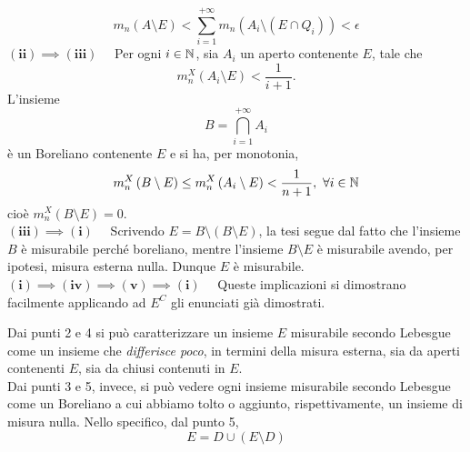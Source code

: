 \begin{demonstration}
\begin{equation*}
	m_n\left(A\setminus E\right)<\sum_{i=1}^{+\infty}m_n\left(A_i\setminus\left(E\cap Q_i\right)\right)<\epsilon
\end{equation*}
$\mathbf{(ii)\implies(iii)}\quad$ Per ogni $i\in\mathbb{N}$, sia $A_i$ un aperto contenente $E$, tale che
\begin{equation*}
	m^{X}_n\left(A_i\setminus E\right)<\frac{1}{i+1}.
\end{equation*}
L'insieme
\begin{equation*}
	B=\bigcap_{i=1}^{+\infty}A_i
\end{equation*}
è un Boreliano contenente $E$ e si ha, per monotonia,
\begin{equation*}
	m_n^{X}\left(B\setminus E\right)\leq m_n^{X}\left(A_i\setminus E\right)<\frac{1}{n+1},\ \forall i\in \mathbb{N}
\end{equation*}
cioè $m_n^{X}\left(B\setminus E\right)=0$.\\
$\mathbf{(iii)\implies(i)}\quad$  Scrivendo $E=B\setminus\left(B\setminus E\right)$, la tesi segue dal fatto che l'insieme $B$ è misurabile perché boreliano, mentre l'insieme $B\setminus E$ è misurabile avendo, per ipotesi, misura esterna nulla. Dunque $E$ è misurabile.\\
$\mathbf{(i)\implies(iv)\implies(v)\implies(i)}\quad$ Queste implicazioni si dimostrano facilmente applicando ad $E^C$ gli enunciati già dimostrati. 
\end{demonstration}
\begin{observe}
	Dai punti 2 e 4 si può caratterizzare un insieme $E$ misurabile secondo Lebesgue come un insieme che \textit{differisce poco}, in termini della misura esterna, sia da aperti contenenti $E$, sia da chiusi contenuti in $E$.\\
	Dai punti 3 e 5, invece, si può vedere ogni insieme misurabile secondo Lebesgue come un Boreliano a cui abbiamo tolto o aggiunto, rispettivamente, un insieme di misura nulla. Nello specifico, dal punto 5,
	\begin{equation*}
		E=D\cup\left(E\setminus D\right)
	\end{equation*}
\end{observe}

